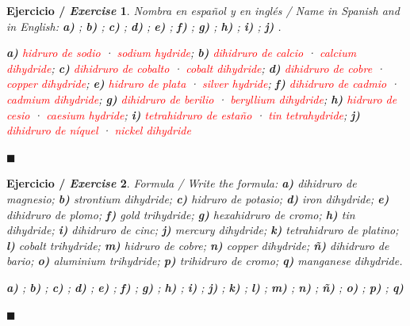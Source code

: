 \documentclass[12pt]{article}
\theoremstyle{mygreennumbox}
\newtheorem{ejercicioT}{Ejercicio / \textit{Exercise}}[section]
\newenvironment{exercise}{\begin{eBoxmygreen}\begin{ejercicioT}}{\hfill{\color{mygreen}\tiny\ensuremath{\blacksquare}}\end{ejercicioT}\end{eBoxmygreen}}
\newcommand{\en}[1]{\textit{#1}}
\begin{document}
\begin{exercise}
    Nombra en español y en inglés / \en{Name in Spanish and in English}: \textbf{a)} ; \textbf{b)} ; \textbf{c)} ; \textbf{d)} ; \textbf{e)} ; \textbf{f)} ; \textbf{g)} ; \textbf{h)} ; \textbf{i)} ; \textbf{j)} .
    \begin{solu}
        \textbf{a)} \textcolor{red}{hidruro de sodio} · \textcolor{red}{\en{sodium hydride}}; \textbf{b)} \textcolor{red}{dihidruro de calcio} · \textcolor{red}{\en{calcium dihydride}}; \textbf{c)} \textcolor{red}{dihidruro de cobalto} · \textcolor{red}{\en{cobalt dihydride}}; \textbf{d)} \textcolor{red}{dihidruro de cobre} · \textcolor{red}{\en{copper dihydride}}; \textbf{e)} \textcolor{red}{hidruro de plata} · \textcolor{red}{\en{silver hydride}}; \textbf{f)} \textcolor{red}{dihidruro de cadmio} · \textcolor{red}{\en{cadmium dihydride}}; \textbf{g)} \textcolor{red}{dihidruro de berilio} · \textcolor{red}{\en{beryllium dihydride}}; \textbf{h)} \textcolor{red}{hidruro de cesio} · \textcolor{red}{\en{caesium hydride}}; \textbf{i)} \textcolor{red}{tetrahidruro de estaño} · \textcolor{red}{\en{tin tetrahydride}}; \textbf{j)} \textcolor{red}{dihidruro de níquel} · \textcolor{red}{\en{nickel dihydride}}
    \end{solu}
\end{exercise}

\begin{exercise}
    Formula / \en{Write the formula}: \textbf{a)} dihidruro de magnesio; \textbf{b)} \en{strontium dihydride}; \textbf{c)} hidruro de potasio; \textbf{d)} \en{iron dihydride}; \textbf{e)} dihidruro de plomo; \textbf{f)} \en{gold trihydride}; \textbf{g)} hexahidruro de cromo; \textbf{h)} \en{tin dihydride}; \textbf{i)} dihidruro de cinc; \textbf{j)} \en{mercury dihydride}; \textbf{k)} tetrahidruro de platino; \textbf{l)} \en{cobalt trihydride}; \textbf{m)} hidruro de cobre; \textbf{n)} \en{copper dihydride}; \textbf{ñ)} dihidruro de bario; \textbf{o)} \en{aluminium trihydride}; \textbf{p)} trihidruro de cromo; \textbf{q)} \en{manganese dihydride}.
    \begin{solu}
        \textbf{a)} \textcolor{red}{}; \textbf{b)} \textcolor{red}{}; \textbf{c)} \textcolor{red}{}; \textbf{d)} \textcolor{red}{}; \textbf{e)} \textcolor{red}{}; \textbf{f)} \textcolor{red}{}; \textbf{g)} \textcolor{red}{}; \textbf{h)} \textcolor{red}{}; \textbf{i)} \textcolor{red}{}; \textbf{j)} \textcolor{red}{}; \textbf{k)} \textcolor{red}{}; \textbf{l)} \textcolor{red}{}; \textbf{m)} \textcolor{red}{}; \textbf{n)} \textcolor{red}{}; \textbf{ñ)} \textcolor{red}{}; \textbf{o)} \textcolor{red}{}; \textbf{p)} \textcolor{red}{}; \textbf{q)} \textcolor{red}{}
    \end{solu}
\end{exercise}
\end{document}
